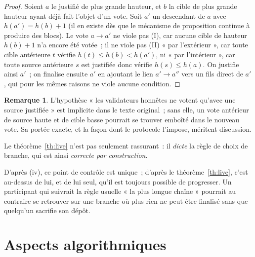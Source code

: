 \documentclass[11pt,a4paper]{article}
\theoremstyle{plain}
\theoremstyle{definition}
\newtheorem{remarque}[theoreme]{Remarque}
\begin{document}
\begin{proof}
Soient $a$ le justifié de plus grande hauteur, et $b$ la cible de plus grande hauteur ayant
déjà fait l'objet d'un vote. Soit $a'$ un descendant de $a$ avec $h(a')=h(b)+1$ (il en existe
dès que le mécanisme de proposition continue à produire des blocs). Le vote $a\to a'$ ne
viole pas (I), car aucune cible de hauteur $h(b)+1$ n'a encore été votée~; il ne viole pas
(II) « par l'extérieur », car toute cible antérieure $t$ vérifie $h(t)\le h(b)<h(a')$, ni
« par l'intérieur », car toute source antérieure $s$ est justifiée donc vérifie $h(s)\le
h(a)$. On justifie ainsi $a'$~; on finalise ensuite $a'$ en ajoutant le lien $a'\to a''$ vers
un fils direct de $a'$, qui pour les mêmes raisons ne viole aucune condition.
\end{proof}

\begin{remarque}
L'hypothèse « les validateurs honnêtes ne votent qu'avec une source justifiée » est implicite
dans le texte original~; sans elle, un vote antérieur de source haute et de cible basse
pourrait se trouver emboîté dans le nouveau vote. Sa portée exacte, et la façon dont le
protocole l'impose, méritent discussion.
\end{remarque}

Le théorème~\ref{th:live} n'est pas seulement rassurant~: il \emph{dicte} la règle de choix
de branche, qui est ainsi \emph{correcte par construction}.

\begin{center}\end{center}

D'après (iv), ce point de contrôle est unique~; d'après le théorème~\ref{th:live}, c'est
au-dessus de lui, et de lui seul, qu'il est toujours possible de progresser. Un participant
qui suivrait la règle usuelle « la plus longue chaîne » pourrait au contraire se retrouver
sur une branche où plus rien ne peut être finalisé sans que quelqu'un sacrifie son dépôt.

\section{Aspects algorithmiques}\label{sec:algo}
\end{document}
